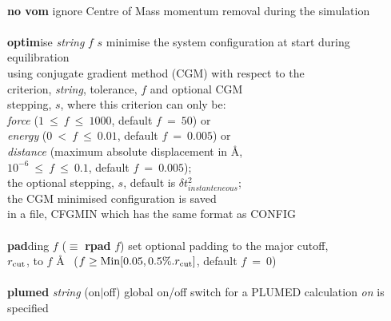 \begin{tabbing}
\>                                              \> \\
\> {\bf no vom}                                 \> ignore Centre of Mass momentum removal during the simulation \\
\>                                              \> \\
\> {\bf optim}ise {\em string} $f$ $s$          \> minimise the system configuration at start during equilibration \\
\>                                              \> using conjugate gradient method (CGM) with respect to the \\
\>                                              \> criterion, {\em string}, tolerance, $f$ and optional CGM \\
\>                                              \> stepping, $s$, where this criterion can only be: \\
\>                                              \> {\em force} ($1~\le~f~\le~1000$, default $f~=~50$) or \\
\>                                              \> {\em energy} ($0~<~f~\le~0.01$, default $f~=~0.005$) or \\
\>                                              \> {\em distance} (maximum absolute displacement in \AA, \\
\>                                              \> $10^{-6}~\le~f~\le~0.1$, default $f~=~0.005$); \\
\>                                              \> the optional stepping, $s$, default is $\delta t_{instanteneous}^{2}$; \\
\>                                              \> the CGM minimised configuration is saved \\
\>                                              \> in a file, CFGMIN which has the same format as CONFIG \\
\>                                              \> \\
\> {\bf pad}ding $f$  ($\equiv$ {\bf rpad} $f$) \> set optional padding to the major cutoff, \\
\>                                              \> $r_{\rm cut}$, to $f$ \AA~ ($f \ge {\rm Min}[0.05,0.5\%.r_{\rm cut}]$, default $f~=~0$) \\
\>                                              \> \\
\> {\bf plumed} {\em string} (on$|$off)         \> global on/off switch for a PLUMED calculation  {\em on} is specified \\

\end{tabbing}
